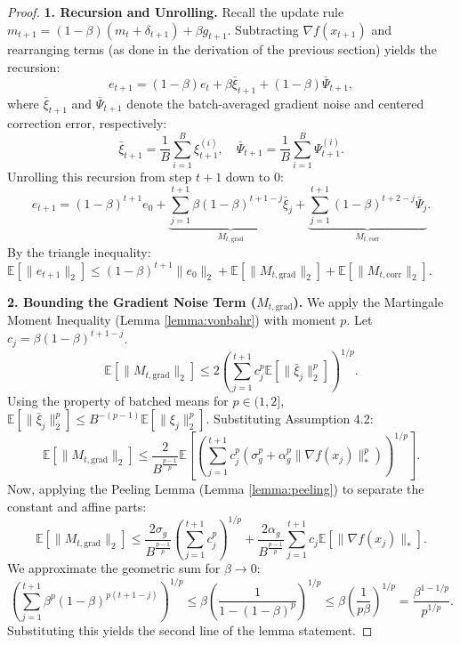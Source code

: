 \documentclass{article}
\theoremstyle{plain}
\theoremstyle{definition}
\theoremstyle{remark}
\begin{document}
\begin{proof}
\textbf{1. Recursion and Unrolling.}
Recall the update rule $m_{t+1} = (1-\beta)(m_t + \delta_{t+1}) + \beta g_{t+1}$. Subtracting $\nabla f(x_{t+1})$ and rearranging terms (as done in the derivation of the previous section) yields the recursion:
\begin{equation}
    e_{t+1} = (1-\beta)e_t + \beta \bar{\xi}_{t+1} + (1-\beta) \bar{\Psi}_{t+1},
\end{equation}
where $\bar{\xi}_{t+1}$ and $\bar{\Psi}_{t+1}$ denote the batch-averaged gradient noise and centered correction error, respectively:
$$ \bar{\xi}_{t+1} = \frac{1}{B}\sum_{i=1}^B \xi_{t+1}^{(i)}, \quad \bar{\Psi}_{t+1} = \frac{1}{B}\sum_{i=1}^B \Psi_{t+1}^{(i)}. $$
Unrolling this recursion from step $t+1$ down to $0$:
\begin{equation}
    e_{t+1} = (1-\beta)^{t+1} e_0 + \underbrace{\sum_{j=1}^{t+1} \beta (1-\beta)^{t+1-j} \bar{\xi}_j}_{M_{t, \text{grad}}} + \underbrace{\sum_{j=1}^{t+1} (1-\beta)^{t+2-j} \bar{\Psi}_j}_{M_{t, \text{corr}}}.
\end{equation}
By the triangle inequality: $\mathbb{E}[\|e_{t+1}\|_2] \le (1-\beta)^{t+1}\|e_0\|_2 + \mathbb{E}[\|M_{t, \text{grad}}\|_2] + \mathbb{E}[\|M_{t, \text{corr}}\|_2]$.

\textbf{2. Bounding the Gradient Noise Term ($M_{t, \text{grad}}$).}
We apply the Martingale Moment Inequality (Lemma \ref{lemma:vonbahr}) with moment $p$. Let $c_j = \beta (1-\beta)^{t+1-j}$.
$$ \mathbb{E}[\|M_{t, \text{grad}}\|_2] \le 2 \left( \sum_{j=1}^{t+1} c_j^p \mathbb{E}[\|\bar{\xi}_j\|_2^p] \right)^{1/p}. $$
Using the property of batched means for $p \in (1, 2]$, $\mathbb{E}[\|\bar{\xi}_j\|_2^p] \le B^{-(p-1)} \mathbb{E}[\|\xi_j\|_2^p]$. Substituting Assumption 4.2:
$$ \mathbb{E}[\|M_{t, \text{grad}}\|_2] \le \frac{2}{B^{\frac{p-1}{p}}} \mathbb{E}\left[ \left( \sum_{j=1}^{t+1} c_j^p (\sigma_g^p + \alpha_g^p \|\nabla f(x_j)\|_*^p) \right)^{1/p} \right]. $$
Now, applying the Peeling Lemma (Lemma \ref{lemma:peeling}) to separate the constant and affine parts:
$$ \mathbb{E}[\|M_{t, \text{grad}}\|_2] \le \frac{2 \sigma_g}{B^{\frac{p-1}{p}}} \left( \sum_{j=1}^{t+1} c_j^p \right)^{1/p} + \frac{2 \alpha_g}{B^{\frac{p-1}{p}}} \sum_{j=1}^{t+1} c_j \mathbb{E}[\|\nabla f(x_j)\|_*]. $$
We approximate the geometric sum for $\beta \to 0$:
$$ \left( \sum_{j=1}^{t+1} \beta^p (1-\beta)^{p(t+1-j)} \right)^{1/p} \le \beta \left( \frac{1}{1-(1-\beta)^p} \right)^{1/p} \le \beta \left( \frac{1}{p\beta} \right)^{1/p} = \frac{\beta^{1-1/p}}{p^{1/p}}. $$
Substituting this yields the second line of the lemma statement.


\end{proof}
\end{document}
